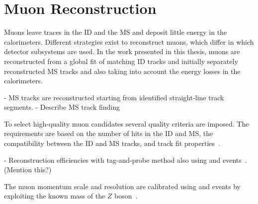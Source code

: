 \section{Muon Reconstruction}
Muons leave traces in the ID and the MS and deposit little energy in the calorimeters. 
Different strategies exist to reconstruct muons, which differ in which detector subsystems are used.
In the work presented in this thesis, muons are reconstructed from a global fit of matching ID tracks and initially separately reconstructed MS tracks and also taking into account the energy losses in the calorimeters. 

- MS tracks are reconstructed starting from identified straight-line track segments. 
- Describe MS track finding

To select high-quality muon candidates several quality criteria are imposed. 
The requirements are based on the number of hits in the ID and MS, the compatibility between the ID and MS tracks, and track fit properties~\cite{MUON-2018-03}.

- Reconstruction efficiencies with tag-and-probe method also using \Jpsimumu and \Zmumu events~\cite{MUON-2018-03}. (Mention this?)

The muon momentum scale and resolution are calibrated using \Jpsimumu and \Zmumu events by exploiting the known mass of the $Z$ boson~\cite{PERF-2015-10}. 







